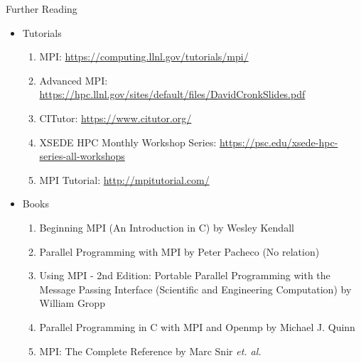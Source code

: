 \documentclass[10pt,t]{beamer}
\begin{document}
\begin{frame}{Further Reading}
  \begin{itemize}
    \item Tutorials
    \begin{enumerate}
      \item MPI: \url{https://computing.llnl.gov/tutorials/mpi/}
      \item Advanced MPI: \url{https://hpc.llnl.gov/sites/default/files/DavidCronkSlides.pdf}
      \item CITutor: \url{https://www.citutor.org/}
      \item XSEDE HPC Monthly Workshop Series: \url{https://psc.edu/xsede-hpc-series-all-workshops}
      \item MPI Tutorial: \url{http://mpitutorial.com/}
    \end{enumerate}
    \item Books
    \begin{enumerate}
      \item Beginning MPI (An Introduction in C) by Wesley Kendall
      \item Parallel Programming with MPI by Peter Pacheco (No relation)
      \item Using MPI - 2nd Edition: Portable Parallel Programming with the Message Passing Interface (Scientific and Engineering Computation) by William Gropp
      \item Parallel Programming in C with MPI and Openmp by Michael J. Quinn
      \item MPI: The Complete Reference by Marc Snir \textit{et. al.}
    \end{enumerate}
  \end{itemize}
\end{frame}
\end{document}
